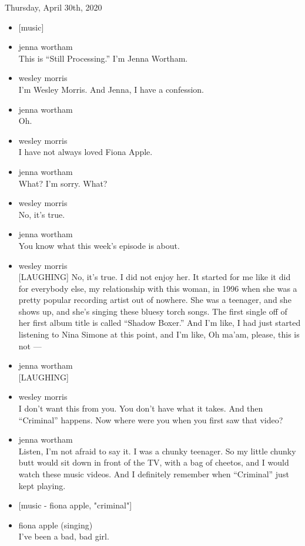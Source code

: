 Thursday, April 30th, 2020

\begin{itemize}
\item
  {[}music{]}
\item
  jenna wortham\\
  This is ``Still Processing.'' I'm Jenna Wortham.
\item
  wesley morris\\
  I'm Wesley Morris. And Jenna, I have a confession.
\item
  jenna wortham\\
  Oh.
\item
  wesley morris\\
  I have not always loved Fiona Apple.
\item
  jenna wortham\\
  What? I'm sorry. What?
\item
  wesley morris\\
  No, it's true.
\item
  jenna wortham\\
  You know what this week's episode is about.
\item
  wesley morris\\
  {[}LAUGHING{]} No, it's true. I did not enjoy her. It started for me
  like it did for everybody else, my relationship with this woman, in
  1996 when she was a pretty popular recording artist out of nowhere.
  She was a teenager, and she shows up, and she's singing these bluesy
  torch songs. The first single off of her first album title is called
  ``Shadow Boxer.'' And I'm like, I had just started listening to Nina
  Simone at this point, and I'm like, Oh ma'am, please, this is not ---
\item
  jenna wortham\\
  {[}LAUGHING{]}
\item
  wesley morris\\
  I don't want this from you. You don't have what it takes. And then
  ``Criminal'' happens. Now where were you when you first saw that
  video?
\item
  jenna wortham\\
  Listen, I'm not afraid to say it. I was a chunky teenager. So my
  little chunky butt would sit down in front of the TV, with a bag of
  cheetos, and I would watch these music videos. And I definitely
  remember when ``Criminal'' just kept playing.
\item
  {[}music - fiona apple, "criminal"{]}
\item
  fiona apple (singing)\\
  I've been a bad, bad girl.
\end{itemize}

